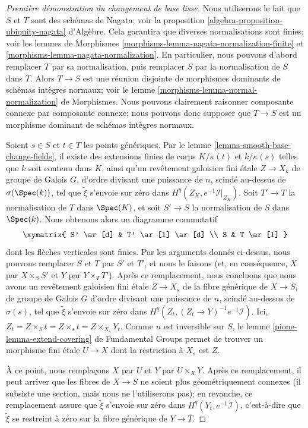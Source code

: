 \begin{proof}[Première démonstration du changement de base lisse]
\medskip\noindent
Nous utiliserons le fait que $S$ et $T$ sont des schémas de Nagata; voir la
proposition \ref{algebra-proposition-ubiquity-nagata} d'Algèbre.
Cela garantira
que diverses normalisations sont finies; voir les
lemmes de Morphismes \ref{morphisms-lemma-nagata-normalization-finite} et
\ref{morphisms-lemma-nagata-normalization}.
En particulier, nous pouvons d'abord remplacer $T$ par sa normalisation,
puis remplacer $S$ par la normalisation de $S$ dans $T$.
Alors $T \to S$ est une réunion disjointe de morphismes
dominants de schémas intègres normaux; voir le
lemme \ref{morphisms-lemma-normal-normalization} de Morphismes.
Nous pouvons clairement raisonner composante connexe
par composante connexe; nous pouvons donc supposer que $T \to S$ est un
morphisme dominant de schémas intègres normaux.

\medskip\noindent
Soient $s \in S$ et $t \in T$ les points génériques. Par le
lemme \ref{lemma-smooth-base-change-fields}, il existe des extensions finies
de corps $K/\kappa(t)$ et $k/\kappa(s)$ telles que $k$ soit contenu dans $K$,
ainsi qu'un revêtement galoisien fini étale $Z \to X_k$ de groupe de Galois $G$,
d'ordre divisant une puissance de $n$, scindé au-dessus de $\sigma(\Spec(k))$,
tel que $\tilde \xi$ s'envoie sur zéro dans $H^q(Z_K, e^{-1}\mathcal{I}|_{Z_K})$.
Soit $T' \to T$ la normalisation de $T$ dans $\Spec(K)$,
et soit $S' \to S$ la normalisation de $S$ dans $\Spec(k)$.
Nous obtenons alors un diagramme commutatif
$$
\xymatrix{
S' \ar[d] & T' \ar[l] \ar[d] \\
S & T \ar[l]
}
$$
dont les flèches verticales sont finies. Par les arguments donnés ci-dessus, nous
pouvons remplacer $S$ et $T$ par $S'$ et $T'$, et nous le faisons (et, en conséquence,
$X$ par $X \times_S S'$ et $Y$ par $Y \times_T T'$). Après ce remplacement,
nous concluons que nous avons un revêtement galoisien fini étale
$Z \to X_s$ de la fibre générique de $X \to S$,
de groupe de Galois $G$ d'ordre divisant une puissance de $n$,
scindé au-dessus de $\sigma(s)$, tel que $\tilde \xi$ s'envoie sur zéro dans
$H^q(Z_t, (Z_t \to Y)^{-1}e^{-1}\mathcal{I})$.
Ici, $Z_t = Z \times_S t = Z \times_s t = Z \times_{X_s} Y_t$.
Comme $n$ est inversible sur $S$,
le lemme \ref{pione-lemma-extend-covering} de Fundamental Groups
permet de trouver un morphisme fini étale $U \to X$ dont la restriction à $X_s$
est $Z$.

\medskip\noindent
À ce point, nous remplaçons $X$ par $U$ et $Y$ par $U \times_X Y$.
Après ce remplacement, il peut arriver que
les fibres de $X \to S$ ne soient plus géométriquement connexes
(il subsiste une section, mais nous ne l'utiliserons pas);
en revanche, ce remplacement assure que $\tilde \xi$ s'envoie sur zéro
dans $H^q(Y_t, e^{-1}\mathcal{I})$, c'est-à-dire que $\tilde \xi$ se restreint à
zéro sur la fibre générique de $Y \to T$.


\end{proof}
